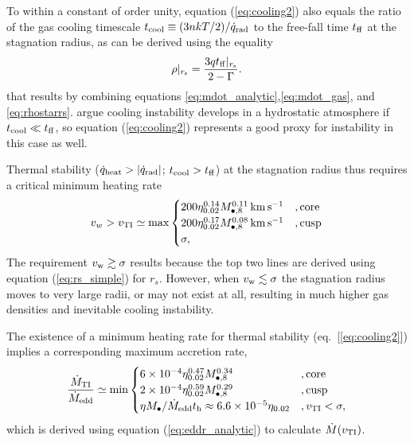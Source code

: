 \documentclass[usenatbib,fleqn]{mn2e}
\newcommand{\tff}{t_{\rm ff}}
\begin{document}
To within a constant of order unity, equation (\ref{eq:cooling2}) also
equals the ratio of the gas cooling timescale $t_{\rm cool} \equiv (3n
kT/2)/\dot{q}_{\rm rad}$ to the free-fall time $t_{\rm ff}$ at the
stagnation radius, as can be derived using the equality
\begin{align}
\rho|_{r_{\rm s}}=\frac{3 q\tff|_{r_{\rm s}}}{2-\Gamma}.
\label{eq:rhors2}
\end{align}
that results by combining equations
\eqref{eq:mdot_analytic},\eqref{eq:mdot_gas}, and
\eqref{eq:rhostarrs}.  \citet{McCourt+12} argue cooling instability
develops in a hydrostatic atmosphere if $t_{\rm cool} \ll t_{\rm ff}$,
so equation (\ref{eq:cooling2}) represents a good proxy for
instability in this case as well.

Thermal stability ($\dot{q}_{\rm heat} > |\dot{q}_{\rm rad}|$; $t_{\rm
  cool} > t_{\rm ff}$) at the stagnation radius thus requires a
critical minimum heating rate
\begin{align}
v_{w} > v_{\rm TI} \simeq
  {\rm max}\begin{cases}
   200 \eta_{0.02}^{0.14} M_{\bullet,8}^{0.11}\,{\rm km\,s^{-1}}  &, \text{core}\\
   200 \eta_{0.02}^{0.17} M_{\bullet,8}^{0.08}\,{\rm km\,s^{-1}}   &, \text{cusp}\\
\sigma,     
  \end{cases}
  \label{eq:cooling3}
\end{align}
The requirement $v_{\rm w} \gtrsim \sigma$ results because the top two lines are derived using equation (\ref{eq:rs_simple}) for $r_s$.  However, when $v_{\rm w} \lesssim \sigma$ the stagnation radius moves to very large radii, or may not exist at all, resulting in much higher gas densities and inevitable cooling instability. 

The existence of a minimum heating rate for thermal stability (eq.~[\ref{eq:cooling2}]) implies a corresponding maximum accretion rate,
\begin{align}
\frac{\dot{M}_{\rm TI}}{\dot{M}_{\rm edd}} \simeq
  {\rm min}\begin{cases}
   6\times 10^{-4} \eta_{0.02}^{0.47} M_{\bullet,8}^{0.34} &, \text{core}\\
   2\times 10^{-4} \eta_{0.02}^{0.59} M_{\bullet,8}^{0.29}    &, \text{cusp}\\
\eta M_{\bullet}/\dot{M}_{\rm edd}t_{\rm h} \approx 6. 6\times 10^{-5}\eta_{0.02}&, v_{\rm TI} < \sigma,
  \end{cases}
  \label{eq:Mdotmax}
\end{align}
which is derived using equation (\ref{eq:eddr_analytic}) to calculate $\dot{M}(v_{\rm TI})$.
\end{document}
